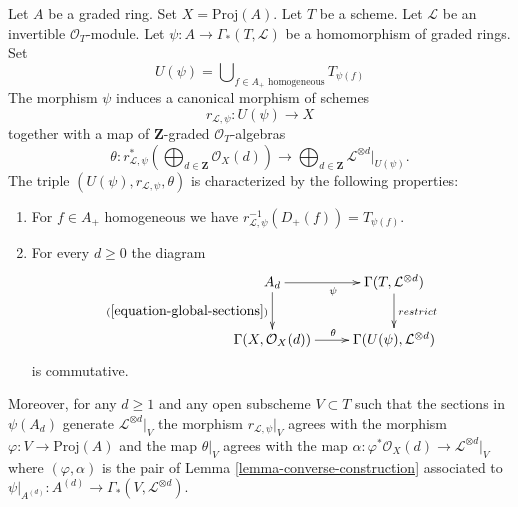 \begin{lemma}
\label{lemma-invertible-map-into-proj}
Let $A$ be a graded ring.
Set $X = \text{Proj}(A)$.
Let $T$ be a scheme.
Let $\mathcal{L}$ be an invertible $\mathcal{O}_T$-module.
Let $\psi : A \to \Gamma_*(T, \mathcal{L})$ be a homomorphism
of graded rings. Set
$$
U(\psi) = \bigcup\nolimits_{f \in A_{+}\text{ homogeneous}} T_{\psi(f)}
$$
The morphism $\psi$ induces a canonical morphism of schemes
$$
r_{\mathcal{L}, \psi} :
U(\psi) \longrightarrow X
$$
together with a map of $\mathbf{Z}$-graded $\mathcal{O}_T$-algebras
$$
\theta :
r_{\mathcal{L}, \psi}^*\left(
\bigoplus\nolimits_{d \in \mathbf{Z}} \mathcal{O}_X(d)
\right)
\longrightarrow
\bigoplus\nolimits_{d \in \mathbf{Z}} \mathcal{L}^{\otimes d}|_{U(\psi)}.
$$
The triple $(U(\psi), r_{\mathcal{L}, \psi}, \theta)$ is
characterized by the following properties:
\begin{enumerate}
\item For $f \in A_{+}$ homogeneous we have
$r_{\mathcal{L}, \psi}^{-1}(D_{+}(f)) = T_{\psi(f)}$.
\item For every $d \geq 0$ the diagram
$$
\xymatrix{
A_d \ar[d]_{(\ref{equation-global-sections})} \ar[r]_{\psi} &
\Gamma(T, \mathcal{L}^{\otimes d}) \ar[d]^{restrict} \\
\Gamma(X, \mathcal{O}_X(d)) \ar[r]^{\theta} &
\Gamma(U(\psi), \mathcal{L}^{\otimes d})
}
$$
is commutative.
\end{enumerate}
Moreover, for any $d \geq 1$ and any open subscheme $V \subset T$
such that the sections in $\psi(A_d)$ generate $\mathcal{L}^{\otimes d}|_V$
the morphism $r_{\mathcal{L}, \psi}|_V$ agrees with the morphism
$\varphi : V \to \text{Proj}(A)$ and the map $\theta|_V$ agrees with the map
$\alpha : \varphi^*\mathcal{O}_X(d) \to \mathcal{L}^{\otimes d}|_V$
where $(\varphi, \alpha)$ is the pair 
of Lemma \ref{lemma-converse-construction}
associated to
$\psi|_{A^{(d)}} : A^{(d)} \to \Gamma_*(V, \mathcal{L}^{\otimes d})$.
\end{lemma}

